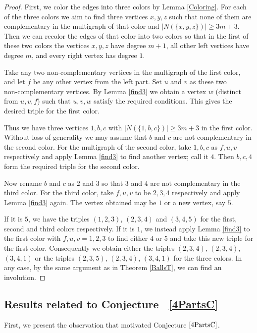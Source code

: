 \documentclass[12pt]{article}
\theoremstyle{definition}
\theoremstyle{plain}
\renewcommand{\ge}{\geqslant}
\begin{document}
\begin{proof}
First, we color the edges into three colors by Lemma \ref{Coloring}. For each of the three colors we aim to find three vertices $x,y,z$ such that none of them are complementary in the multigraph of that color and $|N(\{x,y,z\})| \ge 3m+3$. Then we can recolor the edges of that color into two colors so that in the first of these two colors the vertices $x,y,z$ have degree $m+1$, all other left vertices have degree $m$, and every right vertex has degree $1$.

Take any two non‑complementary vertices in the multigraph of the first color, and let $f$ be any other vertex from the left part. Set $u$ and $v$ as these two non‑complementary vertices. By Lemma \ref{find3} we obtain a vertex $w$ (distinct from $u,v,f$) such that $u,v,w$ satisfy the required conditions. This gives the desired triple for the first color.

Thus we have three vertices $1,b,c$ with $|N(\{1,b,c\})| \ge 3m+3$ in the first color. Without loss of generality we may assume that $b$ and $c$ are not complementary in the second color. For the multigraph of the second color, take $1,b,c$ as $f,u,v$ respectively and apply Lemma \ref{find3} to find another vertex; call it $4$. Then $b,c,4$ form the required triple for the second color.

Now rename $b$ and $c$ as $2$ and $3$ so that $3$ and $4$ are not complementary in the third color. For the third color, take $f,u,v$ to be $2,3,4$ respectively and apply Lemma \ref{find3} again. The vertex obtained may be $1$ or a new vertex, say $5$.

If it is $5$, we have the triples $(1,2,3)$, $(2,3,4)$ and $(3,4,5)$ for the first, second and third colors respectively.  
If it is $1$, we instead apply Lemma \ref{find3} to the first color with $f,u,v = 1,2,3$ to find either $4$ or $5$ and take this new triple for the first color. Consequently we obtain either the triples $(2,3,4)$, $(2,3,4)$, $(3,4,1)$ or the triples $(2,3,5)$, $(2,3,4)$, $(3,4,1)$ for the three colors. In any case, by the same argument as in Theorem \ref{BallsT}, we can find an involution.
\end{proof}

\subsection{Results related to Conjecture ~\ref{4PartsC}}

First, we present the observation that motivated Conjecture $\ref{4PartsC}$.
\end{document}
